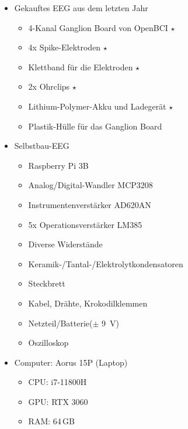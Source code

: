 \documentclass[10pt]{article}
\begin{document}
\begin{itemize}
    \item Gekauftes EEG aus dem letzten Jahr
        \begin{multicols}{2}
        \begin{itemize}
            \item 4-Kanal Ganglion Board von OpenBCI $\star$
            \item 4x Spike-Elektroden $\star$
            \item Klettband für die Elektroden $\star$
            \item 2x Ohrclips $\star$
            \item Lithium-Polymer-Akku und Ladegerät $\star$
            \item Plastik-Hülle für das Ganglion Board
        \end{itemize}
        \end{multicols}
    \item Selbstbau-EEG
        \begin{multicols}{2}
        \begin{itemize}
            \item Raspberry Pi 3B
            \item Analog/Digital-Wandler MCP3208
            \item Instrumentenverstärker AD620AN
            \item 5x Operationsverstärker LM385
            \item Diverse Widerstände
            \item Keramik-/Tantal-/Elektrolytkondensatoren %
            \item Steckbrett
            \item Kabel, Drähte, Krokodilklemmen
            \item Netzteil/Batterie($\pm$ \SI{9}{\volt})
            \item Oszilloskop
        \end{itemize}
        \end{multicols}
    \item Computer: Aorus 15P (Laptop)
    \begin{multicols}{3}
    \begin{itemize}
        \item CPU: i7-11800H
        \item GPU: RTX 3060
        \item RAM: 64\,GB
    \end{itemize}

\end{multicols}
\end{itemize}
\end{document}
